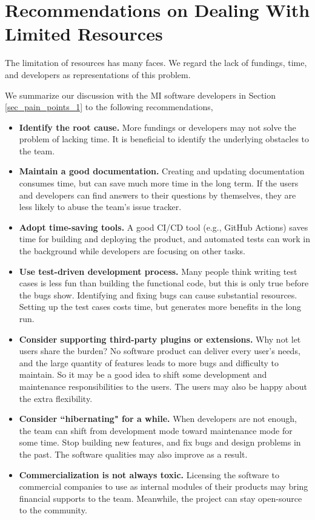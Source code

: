 \section{Recommendations on Dealing With Limited Resources}
\label{sec_recommendations_limited_resources}

The limitation of resources has many faces. We regard the lack of fundings, time, and developers as representations of this problem.

We summarize our discussion with the MI software developers in Section \ref{sec_pain_points_1} to the following recommendations,
\begin{itemize}
\item \textbf{Identify the root cause.} More fundings or developers may not solve the problem of lacking time. It is beneficial to identify the underlying obstacles to the team.

\item \textbf{Maintain a good documentation.} Creating and updating documentation consumes time, but can save much more time in the long term. If the users and developers can find answers to their questions by themselves, they are less likely to abuse the team's issue tracker.

\item \textbf{Adopt time-saving tools.} A good CI/CD tool (e.g., GitHub Actions) saves time for building and deploying the product, and automated tests can work in the background while developers are focusing on other tasks.

\item \textbf{Use test-driven development process.} Many people think writing test cases is less fun than building the functional code, but this is only true before the bugs show. Identifying and fixing bugs can cause substantial resources. Setting up the test cases costs time, but generates more benefits in the long run.

\item \textbf{Consider supporting third-party plugins or extensions.} Why not let users share the burden? No software product can deliver every user's needs, and the large quantity of features leads to more bugs and difficulty to maintain. So it may be a good idea to shift some development and maintenance responsibilities to the users. The users may also be happy about the extra flexibility.

\item \textbf{Consider ``hibernating" for a while.} When developers are not enough, the team can shift from development mode toward maintenance mode for some time. Stop building new features, and fix bugs and design problems in the past. The software qualities may also improve as a result.

\item \textbf{Commercialization is not always toxic.} Licensing the software to commercial companies to use as internal modules of their products may bring financial supports to the team. Meanwhile, the project can stay open-source to the community.
\end{itemize}

